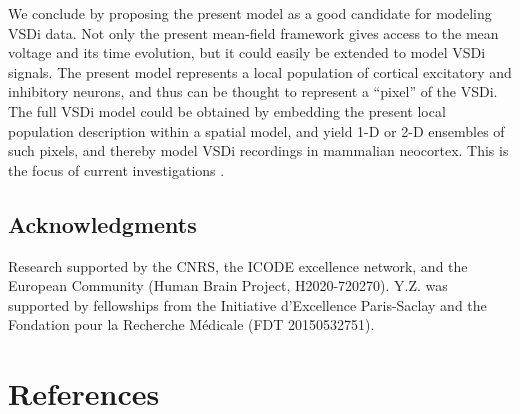 \documentclass[8pt, colorlinks, a4paper]{article}
\begin{document}
We conclude by proposing the present model as a good candidate for
modeling VSDi data.  Not only the present mean-field framework gives
access to the mean voltage and its time evolution, but it could easily
be extended to model VSDi signals.  The present model represents a
local population of cortical excitatory and inhibitory neurons, and
thus can be thought to represent a ``pixel'' of the VSDi.  The full
VSDi model could be obtained by embedding the present local population
description within a spatial model, and yield 1-D or 2-D ensembles of
such pixels, and thereby model VSDi recordings in mammalian neocortex.
This is the focus of current investigations \cite{Destexhe2015}.

\subsection*{Acknowledgments} 

Research supported by the CNRS, the ICODE excellence network, and the
European Community (Human Brain Project, H2020-720270).  Y.Z. was
supported by fellowships from the Initiative d'Excellence Paris-Saclay
and the Fondation pour la Recherche M\'edicale (FDT 20150532751).

\section{References}
\label{sec-6}
\small


\end{document}
